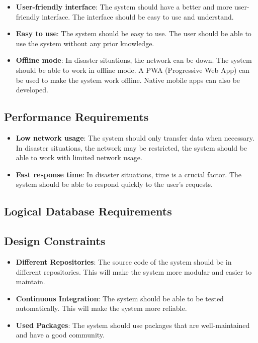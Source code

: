 \documentclass[a4paper]{article}
\begin{document}
        \begin{itemize}
            \item \textbf{User-friendly interface}: The system should have a better and more user-friendly interface. The interface should be easy to use and understand.
            \item \textbf{Easy to use}: The system should be easy to use. The user should be able to use the system without any prior knowledge.
            \item \textbf{Offline mode}: In disaster situations, the network can be down. The system should be able to work in offline mode. A PWA (Progressive Web App) can be used to make the system work offline. Native mobile apps can also be developed.
        \end{itemize}
        
        \subsection{Performance Requirements}
        
        \begin{itemize}
            \item \textbf{Low network usage}: The system should only transfer data when necessary. In disaster situations, the network may be restricted, the system should be able to work with limited network usage.
            \item \textbf{Fast response time}: In disaster situations, time is a crucial factor. The system should be able to respond quickly to the user's requests.
        \end{itemize}
        
        \subsection{Logical Database Requirements}


        \subsection{Design Constraints}

        \begin{itemize}
            \item \textbf{Different Repositories}: The source code of the system should be in different repositories. This will make the system more modular and easier to maintain.
            \item \textbf{Continuous Integration}: The system should be able to be tested automatically. This will make the system more reliable.
            \item \textbf{Used Packages}: The system should use packages that are well-maintained and have a good community.
        \end{itemize}
\end{document}
